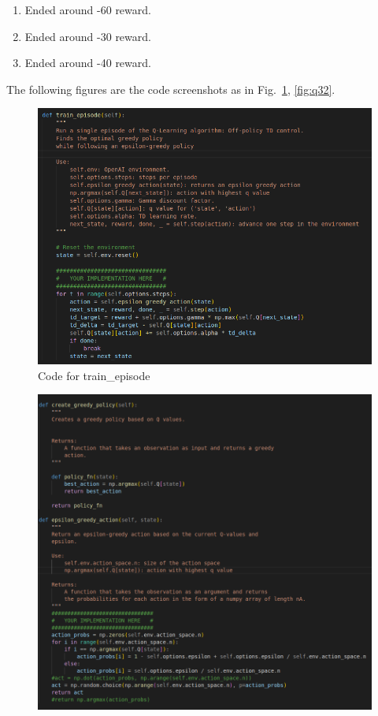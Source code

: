 \documentclass[a4paper]{article}
\theoremstyle{definition}
\newenvironment{soln}{
    \leavevmode\color{blue}\ignorespaces
}{}
\begin{document}
\begin{soln}
    \begin{enumerate}
        \item Ended around -60 reward.
        \item Ended around -30 reward.
        \item Ended around -40 reward.
    \end{enumerate}
    The following figures are the code screenshots as in Fig.~\ref{fig:q31}, \ref{fig:q32}.
    \begin{figure}[H]
        \centering
        \includegraphics[width=0.8\linewidth]{q3code1.png}
        \caption{Code for train\_episode}
        \label{fig:q31}
    \end{figure}
    \begin{figure}[H]
        \centering
        \includegraphics[width=0.8\linewidth]{q3code2.png}

\end{figure}
\end{soln}
\end{document}
